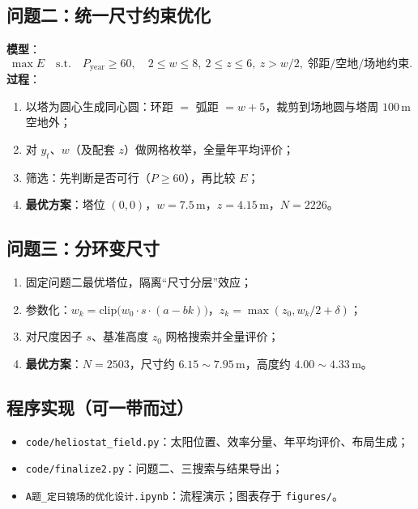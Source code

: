 \documentclass[12pt,a4paper]{ctexart}
\begin{document}
\subsection{问题二：统一尺寸约束优化}
\textbf{模型}：
\begin{equation}
\max E\quad\mathrm{s.t.}\quad P_{\mathrm{year}}\ge60,\quad
2\le w\le8,\ 2\le z\le6,\ z>w/2,\ \text{邻距/空地/场地约束}.
\end{equation}
\textbf{过程}：
\begin{enumerate}
  \item 以塔为圆心生成同心圆：环距 $=$ 弧距 $=w+5$，裁剪到场地圆与塔周 $100\,\mathrm{m}$ 空地外；
  \item 对 $y_t$、$w$（及配套 $z$）做网格枚举，全量年平均评价；
  \item 筛选：先判断是否可行（$P\ge60$），再比较 $E$；
  \item \textbf{最优方案}：塔位 $(0,0)$，$w=7.5\,\mathrm{m}$，$z=4.15\,\mathrm{m}$，$N=2226$。
\end{enumerate}

\subsection{问题三：分环变尺寸}
\begin{enumerate}
  \item 固定问题二最优塔位，隔离“尺寸分层”效应；
  \item 参数化：$w_k=\mathrm{clip}\bigl(w_0\cdot s\cdot(a-bk)\bigr)$，$z_k=\max(z_0,w_k/2+\delta)$；
  \item 对尺度因子 $s$、基准高度 $z_0$ 网格搜索并全量评价；
  \item \textbf{最优方案}：$N=2503$，尺寸约 $6.15\sim7.95\,\mathrm{m}$，高度约 $4.00\sim4.33\,\mathrm{m}$。
\end{enumerate}

\subsection{程序实现（可一带而过）}
\begin{itemize}
  \item \texttt{code/heliostat\_field.py}：太阳位置、效率分量、年平均评价、布局生成；
  \item \texttt{code/finalize2.py}：问题二、三搜索与结果导出；
  \item \texttt{A题\_定日镜场的优化设计.ipynb}：流程演示；图表存于 \texttt{figures/}。
\end{itemize}
\end{document}
